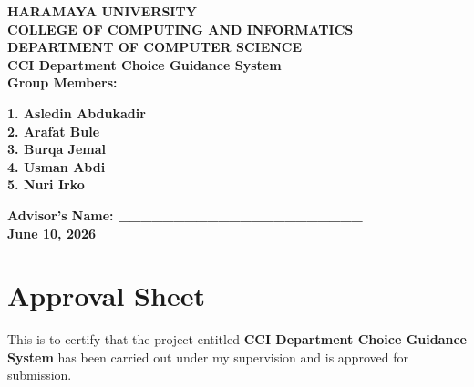 \documentclass[12pt, a4paper]{article}
\begin{document}
\newpage
\thispagestyle{plain}
\setcounter{page}{1}
\begin{center}
\vspace*{1.0cm}

{\fontsize{14}{21}\bfseries HARAMAYA UNIVERSITY}\\[0.5cm]
{\fontsize{14}{21}\bfseries COLLEGE OF COMPUTING AND INFORMATICS}\\[0.5cm]
{\fontsize{14}{21}\bfseries DEPARTMENT OF COMPUTER SCIENCE}\\[1.5cm]

{\fontsize{14}{21}\bfseries CCI Department Choice Guidance System}\\[1.5cm]

{\fontsize{14}{21}\bfseries Group Members:}\\[0.3cm]
\begin{flushleft}
\fontsize{14}{21}\bfseries
\hspace*{3cm} 1. Asledin Abdukadir \\
\hspace*{3cm} 2. Arafat Bule \\
\hspace*{3cm} 3. Burqa Jemal \\
\hspace*{3cm} 4. Usman Abdi \\
\hspace*{3cm} 5. Nuri Irko \\
\end{flushleft}
\vspace{1.5cm}

{\fontsize{14}{21}\bfseries Advisor's Name: \_\_\_\_\_\_\_\_\_\_\_\_\_\_\_\_\_\_\_\_\_\_}\\[2.5cm]

\vfill
{\fontsize{14}{21}\bfseries June 10, 2026}
\end{center}

\newpage
\newpage
\fancyhf{}
\fancyfoot[C]{\thepage}
\section*{Approval Sheet}
\vspace{1cm}
This is to certify that the project entitled \textbf{CCI Department Choice Guidance System} has been carried out under my supervision and is approved for submission.
\end{document}
